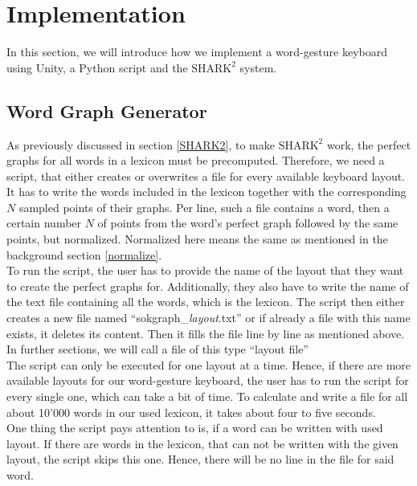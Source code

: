 \chapter{Implementation}

In this section, we will introduce how we implement a word-gesture keyboard using Unity, a Python script and the $\text{SHARK}^2$ system.

\section{Word Graph Generator}
As previously discussed in section \ref{SHARK2}, to make $\text{SHARK}^2$ work, the perfect graphs for all words in a lexicon must be precomputed. Therefore, we need a script, that either creates or overwrites a file for every available keyboard layout. It has to write the words included in the lexicon together with the corresponding $N$ sampled points of their graphs. Per line, such a file contains a word, then a certain number $N$ of points from the word's perfect graph followed by the same points, but normalized. Normalized here means the same as mentioned in the background section \ref{normalize}.\\
To run the script, the user has to provide the name of the layout that they want to create the perfect graphs for. Additionally, they also have to write the name of the text file containing all the words, which is the lexicon. The script then either creates a new file named ``sokgraph\_\textit{layout}.txt'' or if already a file with this name exists, it deletes its content. Then it fills the file line by line as mentioned above. In further sections, we will call a file of this type ``layout file''\\
The script can only be executed for one layout at a time. Hence, if there are more available layouts for our word-gesture keyboard, the user has to run the script for every single one, which can take a bit of time. To calculate and write a file for all about 10'000 words in our used lexicon, it takes about four to five seconds.\\
One thing the script pays attention to is, if a word can be written with used layout. If there are words in the lexicon, that can not be written with the given layout, the script skips this one. Hence, there will be no line in the file for said word. 

